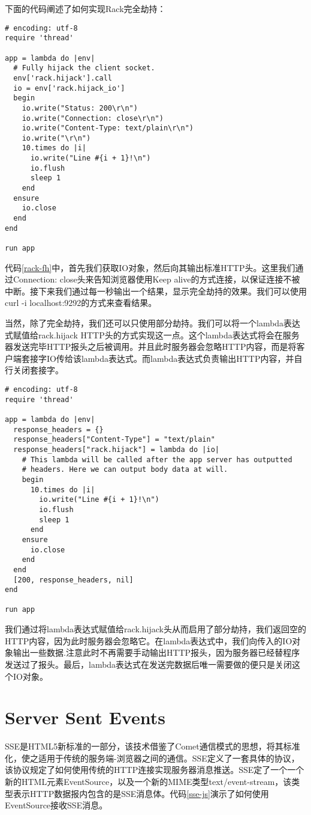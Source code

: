 下面的代码阐述了如何实现Rack完全劫持：

\begin{lstlisting}[caption={Rack完全劫持}, label=rack-fh]
# encoding: utf-8
require 'thread'

app = lambda do |env|
  # Fully hijack the client socket.
  env['rack.hijack'].call
  io = env['rack.hijack_io']
  begin
    io.write("Status: 200\r\n")
    io.write("Connection: close\r\n")
    io.write("Content-Type: text/plain\r\n")
    io.write("\r\n")
    10.times do |i|
      io.write("Line #{i + 1}!\n")
      io.flush
      sleep 1
    end
  ensure
    io.close
  end
end

run app
\end{lstlisting}

代码\ref{rack-fh}中，首先我们获取IO对象，然后向其输出标准HTTP头。这里我们通过Connection: close头来告知浏览器使用Keep alive的方式连接，以保证连接不被中断。接下来我们通过每一秒输出一个结果，显示完全劫持的效果。我们可以使用curl -i localhost:9292的方式来查看结果。

当然，除了完全劫持，我们还可以只使用部分劫持。我们可以将一个lambda表达式赋值给rack.hijack HTTP头的方式实现这一点。这个lambda表达式将会在服务器发送完毕HTTP报头之后被调用。并且此时服务器会忽略HTTP内容，而是将客户端套接字IO传给该lambda表达式。而lambda表达式负责输出HTTP内容，并自行关闭套接字。

\begin{lstlisting}[caption={Rack完全劫持}, label=rack-ph]
# encoding: utf-8
require 'thread'

app = lambda do |env|
  response_headers = {}
  response_headers["Content-Type"] = "text/plain"
  response_headers["rack.hijack"] = lambda do |io|
    # This lambda will be called after the app server has outputted
    # headers. Here we can output body data at will.
    begin
      10.times do |i|
        io.write("Line #{i + 1}!\n")
        io.flush
        sleep 1
      end
    ensure
      io.close
    end
  end
  [200, response_headers, nil]
end

run app
\end{lstlisting}

我们通过将lambda表达式赋值给rack.hijack头从而启用了部分劫持，我们返回空的HTTP内容，因为此时服务器会忽略它。在lambda表达式中，我们向传入的IO对象输出一些数据.注意此时不再需要手动输出HTTP报头，因为服务器已经替程序发送过了报头。最后，lambda表达式在发送完数据后唯一需要做的便只是关闭这个IO对象。

\section{Server Sent Events}
SSE是HTML5新标准的一部分，该技术借鉴了Comet通信模式的思想，将其标准化，使之适用于传统的服务端-浏览器之间的通信。SSE定义了一套具体的协议，该协议规定了如何使用传统的HTTP连接实现服务器消息推送。SSE定了一个一个新的HTML元素EventSource，以及一个新的MIME类型text/event-stream，该类型表示HTTP数据报内包含的是SSE消息体。代码\ref{sse-js}演示了如何使用EventSource接收SSE消息。

